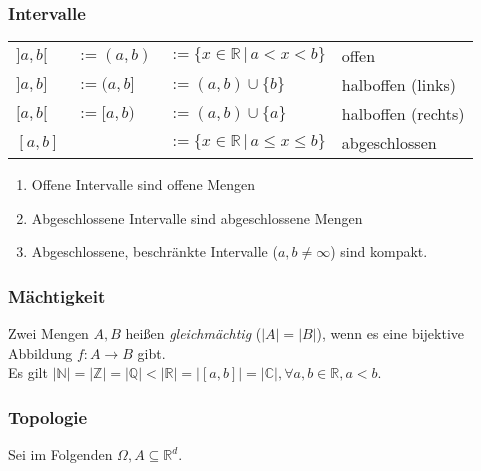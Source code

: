 \documentclass[a4paper, 9pt, DIV=24]{scrartcl}
\newcommand{\N}{\mathbb{N}}
\newcommand{\R}{\mathbb{R}}
\begin{document}
\subsubsection{Intervalle}
\begin{tabular}{llll}
$]a,b[$ & $:= (a,b)$ & $ := \{x\in\mathbb{R}\, |\, a < x < b\}$ & offen \\
$]a,b]$ & $:= (a,b]$ & $ := (a,b) \cup \{b\} $ & halboffen (links) \\
$[a,b[$ & $:= [a,b)$ & $ := (a,b) \cup \{a\} $ & halboffen (rechts) \\
$[a,b]$ &            & $ := \{x\in\mathbb{R}\, |\, a \leq x \leq b\}$ & abgeschlossen \\
\end{tabular}
\begin{enumerate}[label={(}\arabic*{)}]
 \item Offene Intervalle sind offene Mengen
 \item Abgeschlossene Intervalle sind abgeschlossene Mengen
 \item Abgeschlossene, beschränkte Intervalle ($a,b \neq \infty$) sind kompakt.
\end{enumerate}
\subsubsection{Mächtigkeit}
Zwei Mengen $A, B$ heißen \emph{gleichmächtig} ($|A| = |B|$), wenn es eine bijektive Abbildung $f: A \rightarrow B$ gibt.\\
Es gilt $|\N| = |\mathbb{Z}| = |\mathbb{Q}| < |\mathbb{R}| = |[a,b]| = |\mathbb{C}|, \forall a, b\in\R, a < b$.

\subsubsection{Topologie}
Sei im Folgenden $\Omega, A \subseteq \R^d$.
\end{document}
